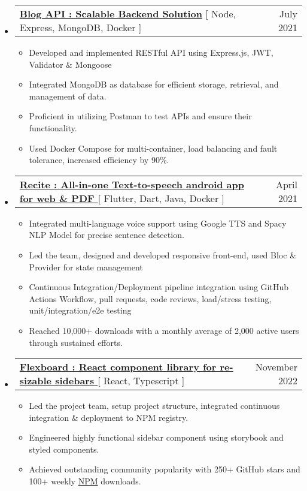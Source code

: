 \documentclass[letterpaper,11pt]{article}
\makeatletter
\newcommand{\resumeItem}[1]{
  \item\small{
    {#1 \vspace{-2pt}}
  }
}
\newcommand{\resumeProjectHeading}[2]{
    \item
    \begin{tabular*}{0.97\textwidth}{l@{\extracolsep{\fill}}r}
      \small#1 & #2 \\
    \end{tabular*}\vspace{-7pt}
}
\newcommand{\resumeSubHeadingListStart}{\begin{itemize}[leftmargin=0.15in, label={}]}
\newcommand{\resumeSubHeadingListEnd}{\end{itemize}}
\newcommand{\resumeItemListStart}{\begin{itemize}}
\newcommand{\resumeItemListEnd}{\end{itemize}\vspace{-5pt}}
\makeatother
\begin{document}
    \resumeSubHeadingListStart
      \resumeProjectHeading
          {\textbf{\href{https://github.com/divshekhar/docker_node_api}{\textbf{Blog API : Scalable Backend Solution}}}{ [ Node, Express, MongoDB, Docker ]}}{July 2021}
          \resumeItemListStart
            \resumeItem{Developed and implemented RESTful API using Express.js, JWT, Validator \& Mongoose}
            \resumeItem{Integrated MongoDB as database for efficient storage, retrieval, and management of data.}
            \resumeItem{Proficient in utilizing Postman to test APIs and ensure their functionality.}
            \resumeItem{Used Docker Compose for multi-container, load balancing and fault tolerance, increased efficiency by 90\%.}
          \resumeItemListEnd
    \resumeSubHeadingListEnd

    \resumeSubHeadingListStart
      \resumeProjectHeading
          {\textbf{\href{https://play.google.com/store/apps/details?id=com.hackthedeveloper.recite}{Recite : All-in-one Text-to-speech android app for web \& PDF }}{[ Flutter, Dart, Java, Docker ]}}{April 2021}
          \resumeItemListStart
           \resumeItem{Integrated multi-language voice support using Google TTS and Spacy NLP Model for precise sentence detection.}
           \resumeItem{Led the team, designed and developed responsive front-end, used Bloc \& Provider for state management}
           \resumeItem{Continuous Integration/Deployment pipeline integration using GitHub Actions Workflow, pull requests, code reviews, load/stress testing, unit/integration/e2e testing}
           \resumeItem{Reached 10,000+ downloads with a monthly average of 2,000 active users through sustained efforts.}
          \resumeItemListEnd
    \resumeSubHeadingListEnd

    \resumeSubHeadingListStart
      \resumeProjectHeading
          {\textbf{\href{https://github.com/dorbus/flexboard}{Flexboard : React component library for re-sizable sidebars }}{[ React, Typescript ]}}{November 2022}
          \resumeItemListStart
            \resumeItem{Led the project team, setup project structure, integrated continuous integration \& deployment to NPM registry.}
            \resumeItem{Engineered highly functional sidebar component using storybook and styled components.}
            \resumeItem{Achieved outstanding community popularity with 250+ GitHub stars and 100+ weekly \href{https://www.npmjs.com/package/@dorbus/flexboard}{NPM} downloads.}
          \resumeItemListEnd
    \resumeSubHeadingListEnd
\end{document}
